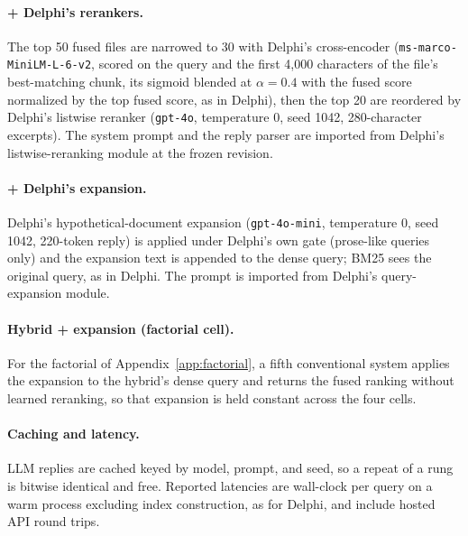 \documentclass{article}
\newcommand{\system}{Delphi}
\begin{document}
\paragraph{+ \system{}'s rerankers.} The top 50 fused files are narrowed to 30 with \system{}'s cross-encoder (\texttt{ms-marco-MiniLM-L-6-v2}, scored on the query and the first 4{,}000 characters of the file's best-matching chunk, its sigmoid blended at $\alpha{=}0.4$ with the fused score normalized by the top fused score, as in \system{}), then the top 20 are reordered by \system{}'s listwise reranker (\texttt{gpt-4o}, temperature 0, seed 1042, 280-character excerpts). The system prompt and the reply parser are imported from \system{}'s listwise-reranking module at the frozen revision.

\paragraph{+ \system{}'s expansion.} \system{}'s hypothetical-document expansion (\texttt{gpt-4o-mini}, temperature 0, seed 1042, 220-token reply) is applied under \system{}'s own gate (prose-like queries only) and the expansion text is appended to the dense query; BM25 sees the original query, as in \system{}. The prompt is imported from \system{}'s query-expansion module.

\paragraph{Hybrid + expansion (factorial cell).} For the factorial of Appendix~\ref{app:factorial}, a fifth conventional system applies the expansion to the hybrid's dense query and returns the fused ranking without learned reranking, so that expansion is held constant across the four cells.

\paragraph{Caching and latency.} LLM replies are cached keyed by model, prompt, and seed, so a repeat of a rung is bitwise identical and free. Reported latencies are wall-clock per query on a warm process excluding index construction, as for \system{}, and include hosted API round trips.
\end{document}
